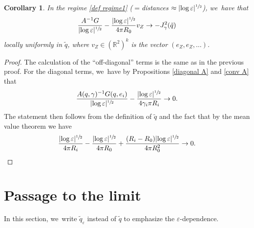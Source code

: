 \documentclass[JEP,XML,SOM,Unicode,published]{cedram}
\let\epsilon\varepsilon
\newtheorem{corollary}[theorem]{Corollary}
\theoremstyle{definition}
\newcommand\R{\mathbb{R}}
\let\eps\epsilon
\begin{document}
\begin{corollary}\label{conv J2}
In the regime \eqref{def regime1} ($={}$distances $\approx|{\log\eps}|^{\sfrac{1}{2}}$), we~have that
\begin{align*}
\frac{A^{-1}G}{|{\log\eps}|^{\sfrac{1}{2}}}-\frac{|{\log\eps}|^{\sfrac{1}{2}}}{4\pi R_0}v_Z\to -J_\gamma^2(\tilde{q})
\end{align*}
locally uniformly in $\tilde{q}$, where $v_Z\in (\R^2)^k$ is the vector $(e_Z,e_Z,\dots)$.
\end{corollary}
\begin{proof}
The calculation of the ``off-diagonal'' terms is the same as in the previous proof. For the diagonal terms, we~have by Propositions \ref{diagonal A} and \ref{conv A} that
\begin{align*}
\frac{A(q,\gamma)^{-1}G(q,e_i)}{|{\log\eps}|^{\sfrac{1}{2}}}-\frac{|{\log\eps}|^{\sfrac{1}{2}}}{4\gamma_i\pi R_i}\to 0.
\end{align*}
The statement then follows from the definition of $\tilde{q}$ and the fact that \eg by the mean value theorem we have
\[
\frac{|{\log\eps}|^{\sfrac{1}{2}}}{4\pi R_i}-\frac{|{\log\eps}|^{\sfrac{1}{2}}}{4\pi R_0}+\frac{(R_i-R_0)|{\log\eps}|^{\sfrac{1}{2}}}{4\pi R_0^2}\to 0.\qedhere
\]
\end{proof}

\section{Passage to the limit}\label{Section5}

In this section, we~write $\tilde{q}_\eps$ instead of $\tilde{q}$ to emphasize the $\eps$-dependence.
\end{document}
